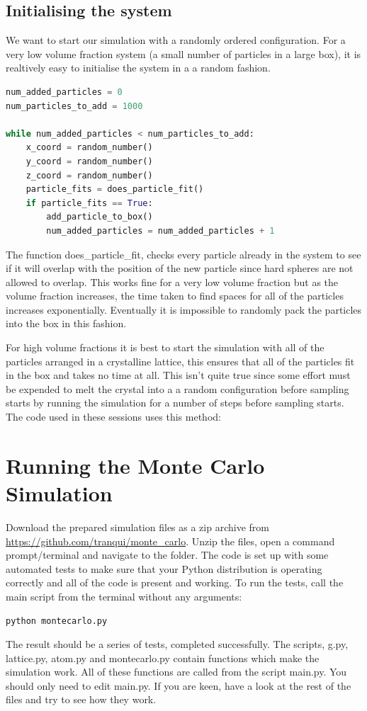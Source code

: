 	\subsection{Initialising the system}\label{lattice}
		We want to start our simulation with a randomly ordered configuration. For a very low volume fraction system (a small number of particles in a large box), it is realtively easy to initialise the system in a a random fashion.
		\begin{lstlisting}[language=Python]
num_added_particles = 0
num_particles_to_add = 1000

while num_added_particles < num_particles_to_add:
	x_coord = random_number()
	y_coord = random_number()
	z_coord = random_number()
	particle_fits = does_particle_fit()
	if particle_fits == True:
		add_particle_to_box()
		num_added_particles = num_added_particles + 1\end{lstlisting}
The function does\_particle\_fit, checks every particle already in the system to see if it will overlap with the position of the new particle since hard spheres are not allowed to overlap. This works fine for a very low volume fraction but as the volume fraction increases, the time taken to find spaces for all of the particles increases exponentially. Eventually it is impossible to randomly pack the particles into the box in this fashion.

		For high volume fractions it is best to start the simulation with all of the particles arranged in a crystalline lattice, this ensures that all of the particles fit in the box and takes no time at all. This isn't quite true since some effort must be expended to melt the crystal into a a random configuration before sampling starts by running the simulation for a number of steps before sampling starts. The code used in these sessions uses this method:


\section{Running the Monte Carlo Simulation}
	Download the prepared simulation files as a zip archive from \url{https://github.com/tranqui/monte_carlo}. Unzip the files, open a command prompt/terminal and navigate to the folder. The code is set up with some automated tests to make sure that your Python distribution is operating correctly and all of the code is present and working. To run the tests, call the main script from the terminal without any arguments:
	\begin{lstlisting}	
python montecarlo.py\end{lstlisting}
	The result should be a series of tests, completed successfully.
	The scripts, g.py, lattice.py, atom.py and montecarlo.py contain functions which make the simulation work. All of these functions are called from the script main.py. You should only need to edit main.py. If you are keen, have a look at the rest of the files and try to see how they work.
	
